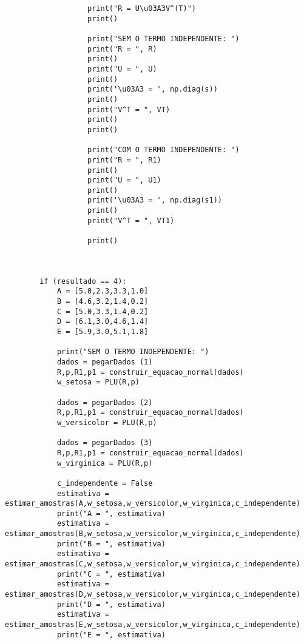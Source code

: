 \documentclass[a4paper,12pt,twoside]{article}
\begin{document}
\begin{lstlisting}
                   print("R = U\u03A3V^(T)")
                   print()
                   
                   print("SEM O TERMO INDEPENDENTE: ")
                   print("R = ", R)
                   print()
                   print("U = ", U)
                   print()
                   print('\u03A3 = ', np.diag(s))
                   print()
                   print("V^T = ", VT)
                   print()
                   print()
                    
                   print("COM O TERMO INDEPENDENTE: ")
                   print("R = ", R1)
                   print()
                   print("U = ", U1)
                   print()
                   print('\u03A3 = ', np.diag(s1))
                   print()
                   print("V^T = ", VT1)
                   
                   print()
                   
               
                
        if (resultado == 4):
            A = [5.0,2.3,3.3,1.0]
            B = [4.6,3.2,1.4,0.2]
            C = [5.0,3.3,1.4,0.2]
            D = [6.1,3.0,4.6,1.4]
            E = [5.9,3.0,5.1,1.8]
            
            print("SEM O TERMO INDEPENDENTE: ")
            dados = pegarDados (1)
            R,p,R1,p1 = construir_equacao_normal(dados)
            w_setosa = PLU(R,p)
            
            dados = pegarDados (2)
            R,p,R1,p1 = construir_equacao_normal(dados)
            w_versicolor = PLU(R,p)
        
            dados = pegarDados (3)
            R,p,R1,p1 = construir_equacao_normal(dados)
            w_virginica = PLU(R,p)
            
            c_independente = False
            estimativa = estimar_amostras(A,w_setosa,w_versicolor,w_virginica,c_independente)
            print("A = ", estimativa)
            estimativa = estimar_amostras(B,w_setosa,w_versicolor,w_virginica,c_independente)
            print("B = ", estimativa)
            estimativa = estimar_amostras(C,w_setosa,w_versicolor,w_virginica,c_independente)
            print("C = ", estimativa)
            estimativa = estimar_amostras(D,w_setosa,w_versicolor,w_virginica,c_independente)
            print("D = ", estimativa)
            estimativa = estimar_amostras(E,w_setosa,w_versicolor,w_virginica,c_independente)
            print("E = ", estimativa)
            

\end{lstlisting}
\end{document}
